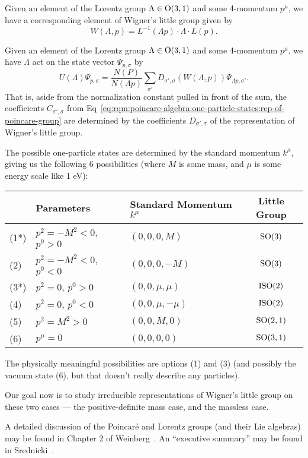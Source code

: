 \begin{corollary}
Given an element of the Lorentz group $\Lambda\in\mathrm{O}(3,1)$ and some
4-momentum $p^{\mu}$, we have a corresponding element of Wigner's little
group given by
\begin{equation}
W(\Lambda,p) = L^{-1}(\Lambda p)\cdot\Lambda\cdot L(p).
\end{equation}
\end{corollary}

\begin{corollary}
Given an element of the Lorentz group $\Lambda\in\mathrm{O}(3,1)$ and some
4-momentum $p^{\mu}$, we have $\Lambda$ act on the state vector
$\Psi_{p,\sigma}$ by
\begin{equation}
U(\Lambda)\Psi_{p,\sigma} = \frac{N(P)}{N(\Lambda p)}\sum_{\sigma'}D_{\sigma',\sigma}(W(\Lambda, p))\Psi_{\Lambda p,\sigma'}.
\end{equation}
That is, aside from the normalization constant pulled in front of the
sum, the coefficients $C_{\sigma',\sigma}$ from Eq~\eqref{eq:rqm:poincare-algebra:one-particle-states:rep-of-poincare-group} are determined by the
coefficients $D_{\sigma',\sigma}$ of the representation of Wigner's
little group.
\end{corollary}

The possible one-particle states are determined by the standard momentum
$k^{\mu}$, giving us the following 6 possibilities (where $M$ is some
mass, and $\mu$ is some energy scale like 1 eV):
\begin{center}
\begin{tabular}{ll|l|c}
    & Parameters & Standard Momentum $k^{\mu}$ & Little Group\\\hline
(1*) & $p^{2}=-M^{2}<0$, $p^{0}>0$ & $(0,0,0,M)$ & $\operatorname{SO}(3)$\\
(2) & $p^{2}=-M^{2}<0$, $p^{0}<0$ & $(0,0,0,-M)$ & $\operatorname{SO}(3)$\\
(3*) & $p^{2}=0$, $p^{0}>0$ & $(0,0,\mu,\mu)$ & $\mathrm{ISO}(2)$\\
(4) & $p^{2}=0$, $p^{0}<0$ & $(0,0,\mu,-\mu)$ & $\mathrm{ISO}(2)$\\
(5) & $p^{2}=M^{2}>0$ & $(0,0,M,0)$ & $\operatorname{SO}(2,1)$\\
(6) & $p^{\mu}=0$ & $(0,0,0,0)$ & $\operatorname{SO}(3,1)$
\end{tabular}
\end{center}
The physically meaningful possibilities are options (1) and (3) (and
possibly the vacuum state (6), but that doesn't really describe any particles).

Our goal now is to study irreducible representations of Wigner's little
group on these two cases --- the positive-definite mass case, and the
massless case.

A detailed discussion of the Poincar\'e and Lorentz groups (and their
Lie algebras) may be found in Chapter 2 of
Weinberg~\cite{Weinberg:1995mt}.
An ``executive summary'' may be found in Srednicki~\cite{Srednicki:2007qs}.

